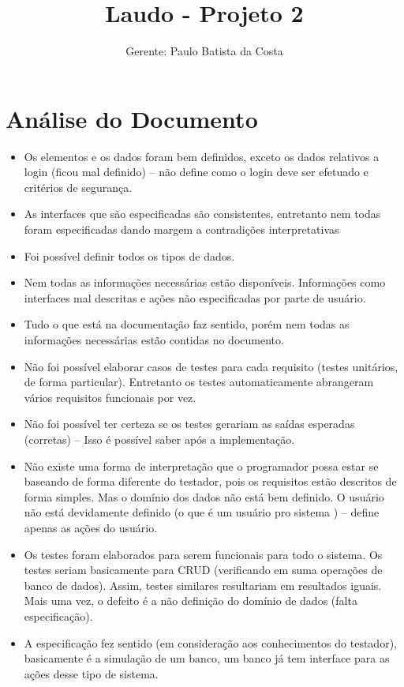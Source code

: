 \documentclass[12pt,a4paper,final]{report}
\author{Gerente: Paulo Batista da Costa}
\title{Laudo - Projeto 2}
\begin{document}
\maketitle
\section*{Análise do Documento}
\begin{itemize}
\item Os elementos e os dados foram bem definidos, exceto os dados relativos a login (ficou mal definido) -- não define como o login deve ser efetuado e critérios de segurança.
\item As interfaces que são especificadas são consistentes, entretanto nem todas foram especificadas dando margem a contradições interpretativas
\item Foi possível definir todos os tipos de dados.
\item Nem todas as informações necessárias estão disponíveis. Informações como interfaces mal descritas e ações não especificadas por parte de usuário.
\item Tudo o que está na documentação faz sentido, porém nem todas as informações necessárias estão contidas no documento.


\item Não foi possível elaborar casos de testes para cada requisito (testes unitários, de forma particular). Entretanto os testes automaticamente abrangeram vários requisitos funcionais por vez.

\item Não foi possível ter certeza se os testes gerariam as saídas esperadas (corretas) -- Isso é possível saber após a implementação.

\item Não existe uma forma de interpretação que o programador possa estar se baseando de forma diferente do testador, pois os requisitos estão descritos de forma simples. Mas o domínio dos dados não está bem definido. O usuário não está devidamente definido (o que é um usuário pro sistema ) -- define apenas as ações do usuário. 

\item Os testes foram elaborados para serem funcionais para todo o sistema. Os testes seriam basicamente para CRUD (verificando em suma operações de banco de dados). Assim, testes similares resultariam em resultados iguais. Mais uma vez, o defeito é a não definição do domínio de dados (falta especificação).

\item A especificação fez sentido (em consideração aos conhecimentos do testador), basicamente é a simulação de um banco, um banco já tem interface para as ações desse tipo de sistema. 
\end{itemize}
\end{document}
